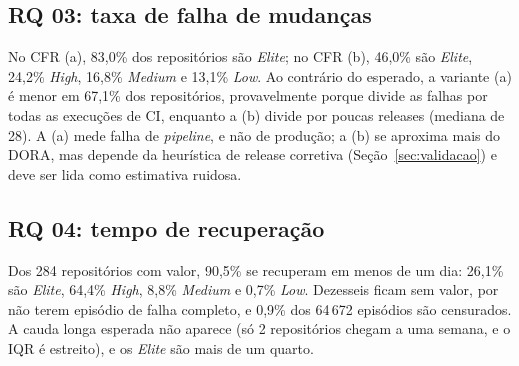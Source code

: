 \subsection{RQ 03: taxa de falha de mudanças}

No CFR (a), 83,0\% dos repositórios são \textit{Elite}; no CFR (b), 46,0\% são \textit{Elite}, 24,2\% \textit{High}, 16,8\% \textit{Medium} e 13,1\% \textit{Low}. Ao contrário do esperado, a variante (a) é menor em 67,1\% dos repositórios, provavelmente porque divide as falhas por todas as execuções de CI, enquanto a (b) divide por poucas releases (mediana de 28). A (a) mede falha de \textit{pipeline}, e não de produção; a (b) se aproxima mais do DORA, mas depende da heurística de release corretiva (Seção~\ref{sec:validacao}) e deve ser lida como estimativa ruidosa.

\subsection{RQ 04: tempo de recuperação}

Dos 284 repositórios com valor, 90,5\% se recuperam em menos de um dia: 26,1\% são \textit{Elite}, 64,4\% \textit{High}, 8,8\% \textit{Medium} e 0,7\% \textit{Low}. Dezesseis ficam sem valor, por não terem episódio de falha completo, e 0,9\% dos 64\,672 episódios são censurados. A cauda longa esperada não aparece (só 2 repositórios chegam a uma semana, e o IQR é estreito), e os \textit{Elite} são mais de um quarto.
